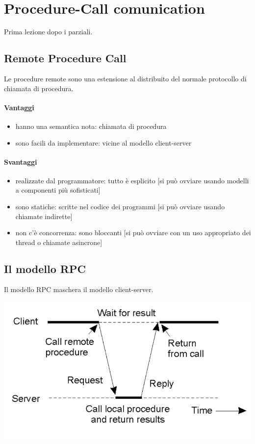 \chapter{Procedure-Call comunication}
Prima lezione dopo i parziali.

\section{Remote Procedure Call}
Le procedure remote sono una estensione al distribuito del normale protocollo di chiamata di procedura.
\subsubsection{Vantaggi}
\begin{itemize}
    \item hanno una semantica nota: chiamata di procedura
    \item sono facili da implementare: vicine al modello client-server
\end{itemize}
\subsubsection{Svantaggi}
\begin{itemize}
    \item realizzate dal programmatore: tutto è esplicito [si può ovviare usando modelli a componenti più sofisticati]
    \item sono statiche: scritte nel codice dei programmi [si può ovviare usando chiamate indirette]
    \item non c'è concorrenza: sono bloccanti [si può ovviare con un uso appropriato dei thread o chiamate asincrone]
\end{itemize}

\section{Il modello RPC}
Il modello RPC maschera il modello client-server.
\begin{center}
    \includegraphics[scale=0.5]{img/RPC_modello1.jpg}
\end{center}
